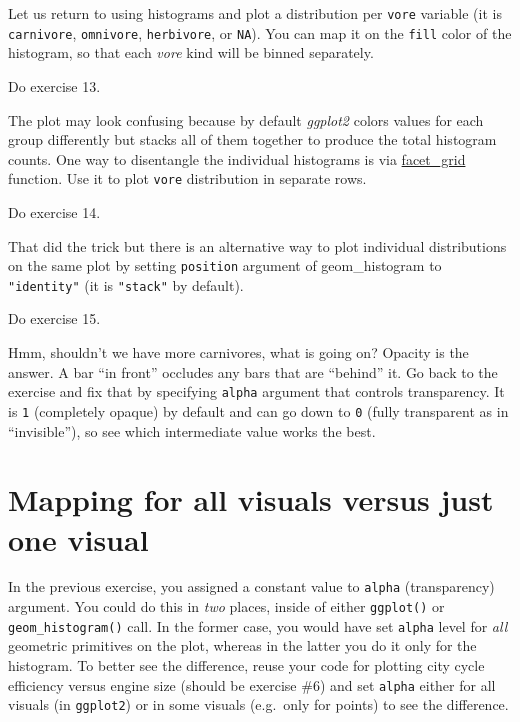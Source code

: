 \documentclass[
]{book}
\begin{document}
Let us return to using histograms and plot a distribution per \texttt{vore} variable (it is \texttt{carnivore}, \texttt{omnivore}, \texttt{herbivore}, or \texttt{NA}). You can map it on the \texttt{fill} color of the histogram, so that each \emph{vore} kind will be binned separately.

Do exercise 13.

The plot may look confusing because by default \emph{ggplot2} colors values for each group differently but stacks all of them together to produce the total histogram counts. One way to disentangle the individual histograms is via \href{https://ggplot2.tidyverse.org/reference/facet_grid.html}{facet\_grid} function. Use it to plot \texttt{vore} distribution in separate rows.

Do exercise 14.

That did the trick but there is an alternative way to plot individual distributions on the same plot by setting \texttt{position} argument of geom\_histogram to \texttt{"identity"} (it is \texttt{"stack"} by default).

Do exercise 15.

Hmm, shouldn't we have more carnivores, what is going on? Opacity is the answer. A bar ``in front'' occludes any bars that are ``behind'' it. Go back to the exercise and fix that by specifying \texttt{alpha} argument that controls transparency. It is \texttt{1} (completely opaque) by default and can go down to \texttt{0} (fully transparent as in ``invisible''), so see which intermediate value works the best.

\hypertarget{mapping-for-all-visuals-versus-just-one-visual}{%
\section{Mapping for all visuals versus just one visual}\label{mapping-for-all-visuals-versus-just-one-visual}}

In the previous exercise, you assigned a constant value to \texttt{alpha} (transparency) argument. You could do this in \emph{two} places, inside of either \texttt{ggplot()} or \texttt{geom\_histogram()} call. In the former case, you would have set \texttt{alpha} level for \emph{all} geometric primitives on the plot, whereas in the latter you do it only for the histogram. To better see the difference, reuse your code for plotting city cycle efficiency versus engine size (should be exercise \#6) and set \texttt{alpha} either for all visuals (in \texttt{ggplot2}) or in some visuals (e.g.~only for points) to see the difference.
\end{document}

